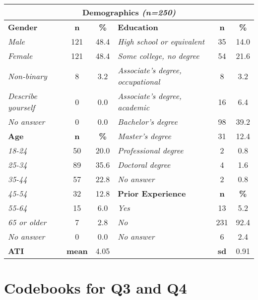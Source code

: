 \begin{table}[h]
\begin{tabularx}{\linewidth}{Xcc|Xcc}
        \toprule
        \multicolumn{6}{c}{\textbf{Demographics} \textit{(n=250)}}\\
        \midrule
        \textbf{Gender} & \textbf{n} & \textbf{\%} & \textbf{Education} & \textbf{n} & \textbf{\%}\\
        \textit{Male} & 121 & 48.4 & \textit{High school or equivalent} & 35 & 14.0\\ 
        \textit{Female} & 121 & 48.4 & \textit{Some college, no degree} & 54 & 21.6\\
        \textit{Non-binary} & 8 & 3.2 & \textit{Associate's degree, occupational} & 8 & 3.2\\
        \textit{Describe yourself} & 0 & 0.0 & \textit{Associate's degree, academic} & 16 & 6.4\\
        \textit{No answer} & 0 & 0.0 & \textit{Bachelor's degree} & 98 & 39.2\\
        \cmidrule(lr){1-3}
        \textbf{Age} & \textbf{n} & \textbf{\%} & \textit{Master's degree} & 31 & 12.4\\
        \textit{18-24} & 50 & 20.0 & \textit{Professional degree} & 2 & 0.8\\
        \textit{25-34} & 89 & 35.6 & \textit{Doctoral degree} & 4 & 1.6\\
        \textit{35-44} & 57 & 22.8 & \textit{No answer} & 2 & 0.8\\
        \cmidrule(lr){4-6}
        \textit{45-54} & 32 & 12.8 & \textbf{Prior Experience} & \textbf{n} & \textbf{\%}\\
        \textit{55-64} & 15 & 6.0 & \textit{Yes} & 13 & 5.2\\
        \textit{65 or older} & 7 & 2.8 & \textit{No} & 231 & 92.4\\
        \textit{No answer} & 0 & 0.0 & \textit{No answer} & 6 & 2.4\\
        \midrule
        \textbf{ATI} & \textbf{mean} & \multicolumn{1}{c}{4.05} & & \textbf{sd} & 0.91\\
        \bottomrule
    \end{tabularx}
\end{table}

\newpage
\section{Codebooks for Q3 and Q4}
\label{xhw_study::app::codebook}


